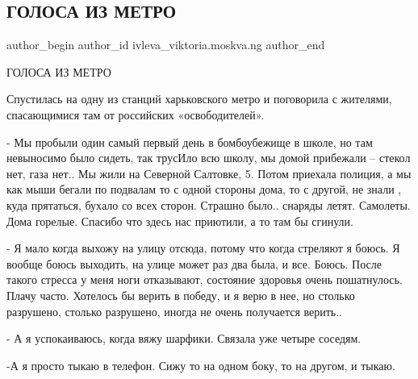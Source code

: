  
 
 
 
 
 
\subsection{ГОЛОСА ИЗ МЕТРО}
\label{sec:22_04_2022.fb.ivleva_viktoria.moskva.ng.1.golosa_iz_metro}
 
\ifcmt
 author_begin
   author_id ivleva_viktoria.moskva.ng
 author_end
\fi

ГОЛОСА ИЗ МЕТРО

Спустилась на одну из станций харьковского метро и поговорила с жителями,
спасающимися там от российских «освободителей».


- Мы пробыли один самый первый день в бомбоубежище в школе, но там невыносимо
было сидеть, так трусИло всю школу, мы домой прибежали – стекол нет, газа нет..
Мы жили на Северной Салтовке, 5. Потом приехала полиция, а мы как мыши бегали
по подвалам то с одной стороны дома, то с другой, не знали , куда прятаться,
бухало со всех сторон. Страшно было.. снаряды летят. Самолеты. Дома горелые.
Спасибо что здесь нас приютили, а то там  бы сгинули.


- Я мало когда выхожу на улицу отсюда, потому что когда стреляют я боюсь. Я
вообще боюсь выходить, на улице может раз два была, и все. Боюсь. После такого
стресса у меня ноги отказывают, состояние здоровья очень пошатнулось. Плачу
часто. Хотелось бы верить в победу, и я верю в нее, но   столько разрушено,
столько разрушено, иногда не очень получается верить.. 


- А я успокаиваюсь, когда вяжу шарфики. Связала уже четыре соседям.

-А я просто тыкаю в телефон. Сижу то на одном боку, то на другом, и тыкаю.


